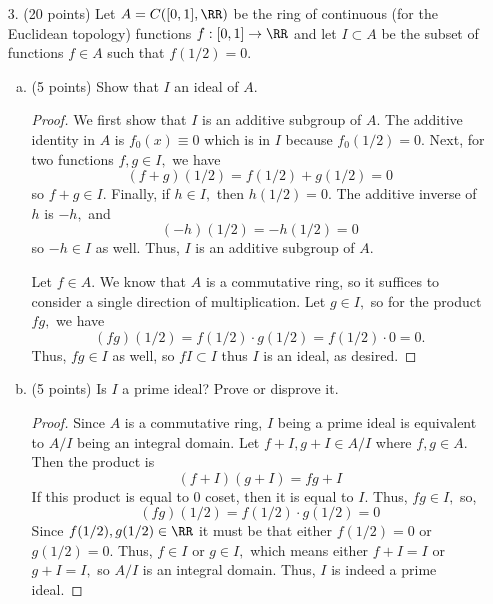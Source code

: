 \documentclass{article}
\begin{document}
\begin{itemize}
		\newpage

	\item[3.] (20 points) Let $A=C([0, 1], \RR)$ be the ring of continuous (for the Euclidean topology) functions $f:[0, 1]\to\RR$ and let $I\subset A$ be the subset of functions $f\in A$ such that $f(1/2)=0.$
		\begin{enumerate}[(a)]
			\item (5 points) Show that $I$ an ideal of $A.$
				\begin{proof}
					We first show that $I$ is an additive subgroup of $A.$ The additive identity in $A$ is $f_0(x)\equiv0$ which is in $I$ because $f_0(1/2)=0.$ Next, for two functions $f, g\in I,$ we have
					\[(f+g)(1/2) = f(1/2) + g(1/2) = 0\]
					so $f+g\in I.$ Finally, if $h\in I,$ then $h(1/2)=0.$ The additive inverse of $h$ is $-h,$ and 
					\[(-h)(1/2)=-h(1/2)=0\]
					so $-h\in I$ as well. Thus, $I$ is an additive subgroup of $A.$

					Let $f\in A.$ We know that $A$ is a commutative ring, so it suffices to consider a single direction of multiplication. Let $g\in I,$ so for the product $fg,$ we have
					\[(fg)(1/2) = f(1/2)\cdot g(1/2) = f(1/2) \cdot 0 = 0.\]
					Thus, $fg\in I$ as well, so $fI\subset I$ thus $I$ is an ideal, as desired.
				\end{proof}

			\item (5 points) Is $I$ a prime ideal? Prove or disprove it.
				\begin{proof}
					Since $A$ is a commutative ring, $I$ being a prime ideal is equivalent to $A/I$ being an integral domain. Let $f+I, g+I\in A/I$ where $f, g\in A.$ Then the product is
					\[(f+I)(g+I)=fg+I\]
					If this product is equal to 0 coset, then it is equal to $I.$ Thus, $fg\in I,$ so,
					\[(fg)(1/2) = f(1/2)\cdot g(1/2) = 0\]
					Since $f(1/2), g(1/2)\in \RR$ it must be that either $f(1/2)=0$ or $g(1/2)=0.$ Thus, $f\in I$ or $g\in I,$ which means either $f+I=I$ or $g+I=I,$ so $A/I$ is an integral domain. Thus, $I$ is indeed a prime ideal.
				\end{proof}


\end{enumerate}
\end{itemize}
\end{document}

